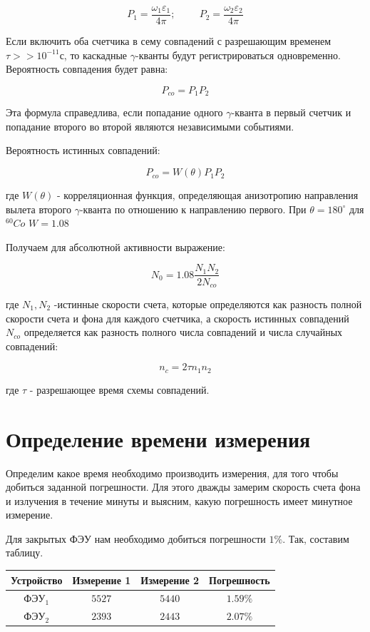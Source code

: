 \documentclass[12pt]{article}
\begin{document}
    $$
      P_1=\frac{\omega _1 \varepsilon _1}{4 \pi}; \hspace{1cm}
      P_2=\frac{\omega _2 \varepsilon _2}{4 \pi}
    $$

    Если включить оба счетчика в сему совпадений с разрешающим временем
    $\tau >> 10^{-11}$с, то каскадные $\gamma$-кванты будут регистрироваться
    одновременно. Вероятность совпадения будет равна:

    $$
      P_{co}=P_1P_2
    $$

    Эта формула справедлива, если попадание одного $\gamma$-кванта  в первый
    счетчик и попадание второго во второй являются независимыми событиями.

    Вероятность истинных совпадений:

    $$
      P_{co}=W(\theta)P_1P_2
    $$

    где $W(\theta)$ - корреляционная функция, определяющая анизотропию
    направления вылета второго $\gamma$-кванта по отношению к направлению
    первого. При $\theta = 180^{\circ}$ для $^{60}Co$ $W=1.08$

    Получаем для абсолютной активности выражение:

    $$
      N_0=1.08 \frac{N_1N_2}{2N_{co}}
    $$

    где $N_1, N_2$ -истинные скорости счета, которые определяются как разность
    полной скорости счета и фона для каждого счетчика, а скорость истинных
    совпадений $N_{co}$ определяется как разность полного числа совпадений и
    числа случайных совпадений:

    $$
      n_c = 2 \tau n_1 n_2
    $$

    где $\tau$ - разрешающее время схемы совпадений.


  \section{Определение времени измерения}

    Определим какое время необходимо производить измерения, для того чтобы
    добиться заданной погрешности. Для этого дважды замерим скорость счета фона
    и излучения в течение минуты и выясним, какую погрешность имеет минутное
    измерение.

    Для закрытых ФЭУ нам необходимо добиться погрешности $1 \%$. Так, составим
    таблицу. \\

    \begin{tabular}{ || c || c | c | c ||}
      \hline
      Устройство & Измерение 1 & Измерение 2 & Погрешность \\ \hline
      ФЭУ$_1$ & $5527$ & $5440$ & $1.59 \%$ \\
      ФЭУ$_2$ & $2393$ & $2443$ & $2.07 \%$ \\
      \hline
    \end{tabular} \\
\end{document}
